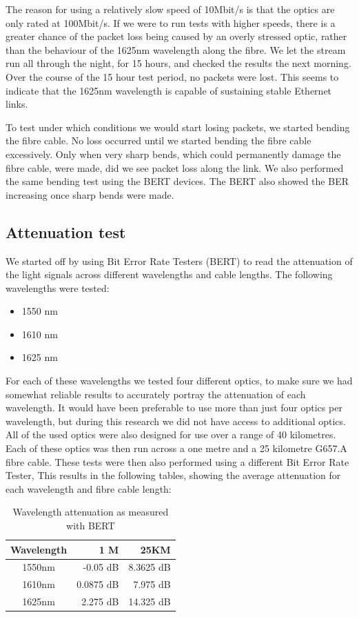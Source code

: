\documentclass{article}
\begin{document}
The reason for using a relatively slow speed of 10Mbit/s is that the optics are only rated at 100Mbit/s.
If we were to run tests with higher speeds, there is a greater chance of the packet loss being caused by an overly stressed optic, rather than the behaviour of the 1625nm wavelength along the fibre.
We let the stream run all through the night, for 15 hours, and checked the results the next morning.
Over the course of the 15 hour test period, no packets were lost.
This seems to indicate that the 1625nm wavelength is capable of sustaining stable Ethernet links.

To test under which conditions we would start losing packets, we started bending the fibre cable.
No loss occurred until we started bending the fibre cable excessively.
Only when very sharp bends, which could permanently damage the fibre cable, were made, did we see packet loss along the link.
We also performed the same bending test using the BERT devices.
The BERT also showed the BER increasing once sharp bends were made.

\subsection{Attenuation test}
We started off by using Bit Error Rate Testers (BERT) to read the attenuation of the light signals across different wavelengths and cable lengths.
The following wavelengths were tested:
\begin{itemize}
	\item 1550 nm
	\item 1610 nm
	\item 1625 nm
\end{itemize}

For each of these wavelengths we tested four different optics, to make sure we had somewhat reliable results to accurately portray the attenuation of each wavelength.
It would have been preferable to use more than just four optics per wavelength, but during this research we did not have access to additional optics.
All of the used optics were also designed for use over a range of 40 kilometres.
Each of these optics was then run across a one metre and a 25 kilometre G657.A fibre cable.
These tests were then also performed using a different Bit Error Rate Tester, 
This results in the following tables, showing the average attenuation for each wavelength and fibre cable length:

\begin{table}[h]
\centering
\label{tab:attenuation-table-ber}
\begin{tabular}{|c|r|r|}
\hline 
\textbf{Wavelength} & \textbf{1 M} & \textbf{25KM}\\ 
\hline 
1550nm & -0.05 dB & 8.3625 dB\\ 
\hline 
1610nm & 0.0875 dB & 7.975 dB\\ 
\hline 
1625nm & 2.275 dB & 14.325 dB\\
\hline
\end{tabular} 
\caption{Wavelength attenuation as measured with BERT}
\end{table}
\end{document}
